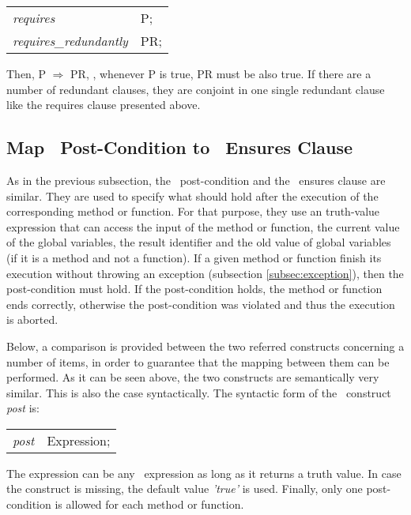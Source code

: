 \begin{center}
\begin{tabular}{ll}
\textit{requires} & P;\\
\textit{requires\_redundantly} & PR;\\
\end{tabular}
\end{center}

Then, P $\Longrightarrow$ PR, \ie, whenever P is true, PR must be also true. If there are a number of redundant clauses, they are conjoint in one single redundant clause like the requires clause presented above.


\subsection{Map \vpp\ Post-Condition to \jml\ Ensures Clause}
\label{subsec:post}

As in the previous subsection, the \vpp\ post-condition and the \jml\ ensures clause are similar. They are used to specify what should hold after the execution of the corresponding method or function. For that purpose, they use an truth-value expression that can access the input of the method or function, the current value of the global variables, the result identifier and the old value of global variables (if it is a method and not a function). If a given method or function finish its execution without throwing an exception (subsection \ref{subsec:exception}), then the post-condition must hold. If the post-condition holds, the method or function ends correctly, otherwise the post-condition was violated and thus the execution is aborted.

Below, a comparison is provided between the two referred constructs concerning a number of items, in order to guarantee that the mapping between them can be performed. As it can be seen above, the two constructs are semantically very similar. This is also the case syntactically. The syntactic form of the \vpp\ construct \textit{post} is:

\begin{center}
\begin{tabular}{ll}
\textit{post} & Expression;\\
\end{tabular}
\end{center}

The expression can be any \vpp\ expression as long as it returns a truth value. In case the construct is missing, the default value \textit{'true'} is used. Finally, only one post-condition is allowed for each method or function.


